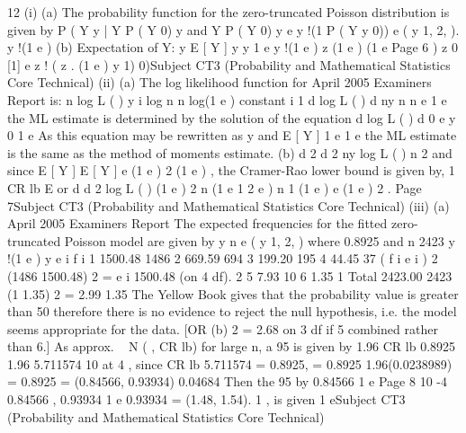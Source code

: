 12
(i)
(a)
The probability function for the zero-truncated Poisson distribution is
given by
P ( Y
y | Y
P ( Y
0)
y and Y
P ( Y 0)
y
e
y !(1 P ( Y
y
0))
e
( y 1, 2, ).
y !(1 e )
(b)
Expectation of Y:
y
E [ Y ]
y
y 1
e
y !(1 e )
z
(1 e )
(1 e
Page 6
)
z 0
[1]
e
z !
( z
.
(1 e
)
y 1)
0)Subject CT3 (Probability and Mathematical Statistics Core Technical)
(ii)
(a)
The log likelihood function for
April 2005
Examiners Report
is:
n
log L ( )
y i log
n
n log(1 e )
constant
i 1
d log L ( )
d
ny
n n
e
1 e
the ML estimate is determined by the solution of the equation
d log L ( )
d
0
e
y
0
1 e
As this equation may be rewritten as
y
and E [ Y ]
1 e
1 e
the ML estimate is the same as the method of moments estimate.
(b)
d 2
d
2
ny
log L ( )
n
2
and since E [ Y ] E [ Y ]
e
(1 e ) 2
(1 e )
, the Cramer-Rao lower bound is
given by,
1
CR lb
E
or
d
d
2
log L ( )
(1 e ) 2
n (1 e
1
2
e )
n
1
(1 e )
e
(1 e ) 2
.
Page 7Subject CT3 (Probability and Mathematical Statistics Core Technical)
(iii)
(a)
April 2005
Examiners Report
The expected frequencies for the fitted zero-truncated Poisson model
are given by
y
n
e
( y 1, 2, ) where
0.8925 and n
2423
y !(1 e )
y
e i
f i
1
1500.48
1486
2
669.59
694
3
199.20
195
4
44.45
37
( f i e i ) 2
(1486 1500.48) 2
=
e i
1500.48
(on 4 df).
2
5
7.93
10
6
1.35
1
Total
2423.00
2423
(1 1.35) 2
= 2.99
1.35
The Yellow Book gives that the probability value is greater than 50%
therefore there is no evidence to reject the null hypothesis, i.e. the
model seems appropriate for the data.
[OR
(b)
2
= 2.68 on 3 df if
5 combined rather than 6.]
As approx. ~ N ( , CR lb) for large n, a 95%
is given by
1.96 CR lb
0.8925 1.96 5.711574 10
at
4
, since CR lb
5.711574
= 0.8925,
= 0.8925 1.96(0.0238989) = 0.8925
= (0.84566, 0.93934)
0.04684
Then the 95%
by
0.84566
1 e
Page 8
10 -4
0.84566
,
0.93934
1 e
0.93934
= (1.48, 1.54).
1
, is given
1 eSubject CT3 (Probability and Mathematical Statistics Core Technical)
